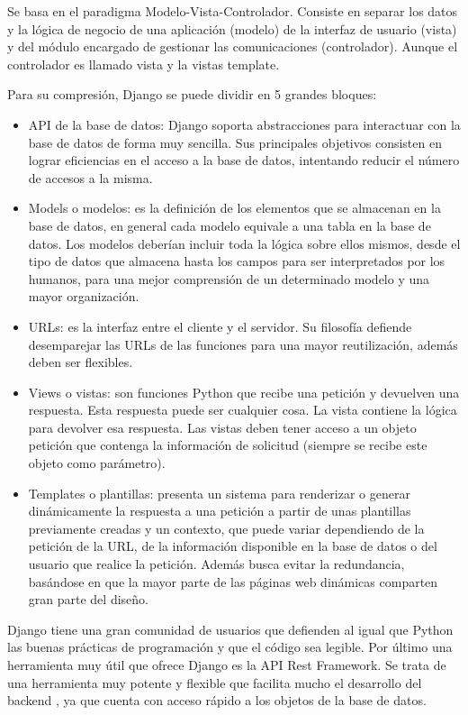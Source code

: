 Se basa en el paradigma Modelo-Vista-Controlador. Consiste en separar los datos y la lógica de negocio de una aplicación (modelo) de la interfaz de usuario (vista)  y del módulo encargado de gestionar las comunicaciones (controlador).  Aunque el controlador es llamado vista y la vistas template. 


Para su compresión, Django se puede dividir en 5 grandes bloques:

\begin{itemize}
\item API de la base de datos: Django soporta abstracciones para interactuar con la base de datos de forma muy sencilla. Sus principales objetivos consisten en lograr eficiencias en el acceso a la base de datos, intentando reducir el número de accesos a la misma.
\item Models o modelos: es la definición de los elementos que se almacenan en la base de datos, en general cada modelo equivale a una tabla en la base de datos. Los modelos deberían incluir toda la lógica sobre ellos mismos, desde el tipo de datos que almacena hasta los campos para ser interpretados por los humanos,  para una mejor comprensión de un determinado modelo y una mayor organización.
\item URLs: es la interfaz entre el cliente y el servidor. Su filosofía defiende desemparejar las URLs de las funciones para una mayor reutilización, además deben ser flexibles.
\item Views o vistas: son funciones Python que recibe una petición y devuelven una respuesta. Esta respuesta puede ser cualquier cosa. La vista contiene la lógica para devolver esa respuesta. Las vistas deben tener acceso a un objeto petición que contenga la información de solicitud (siempre se recibe este objeto como parámetro). 
\item Templates o plantillas: presenta un sistema para renderizar o generar dinámicamente la respuesta a una petición a partir de unas plantillas previamente creadas y un contexto, que puede variar dependiendo de la petición de la URL, de la información disponible en la base de datos o del usuario que realice la petición. Además busca evitar la redundancia, basándose en que la mayor parte de las páginas web dinámicas comparten gran parte del diseño. 
\end{itemize}


Django tiene una gran comunidad de usuarios que defienden al igual que Python las buenas prácticas de programación y que el código sea legible.
Por último una herramienta muy útil que ofrece Django es la API Rest Framework. Se trata de una herramienta muy potente y flexible que facilita mucho el desarrollo del backend , ya que cuenta con acceso rápido a los objetos de la base de datos.

